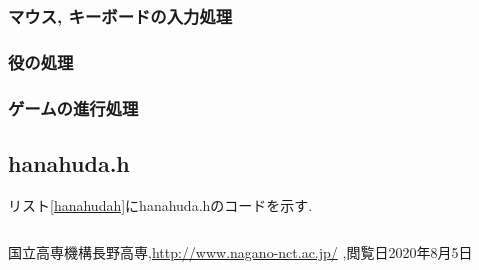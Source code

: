 \documentclass[a4j]{jarticle}
\begin{document}
    \subsubsection{マウス, キーボードの入力処理}
    \subsubsection{役の処理}
    \subsubsection{ゲームの進行処理}

    \subsection{hanahuda.h}
    リスト\ref{hanahudah}にhanahuda.hのコードを示す.
    \begin{lstlisting}[basicstyle=\ttfamily\footnotesize, frame=single,label=hanahudah,caption=hanahuda.h]
    \end{lstlisting}

        \begin{thebibliography}{9}
            国立高専機構長野高専,\url{http://www.nagano-nct.ac.jp/} ,閲覧日2020年8月5日
          \end{thebibliography}
\end{document}
